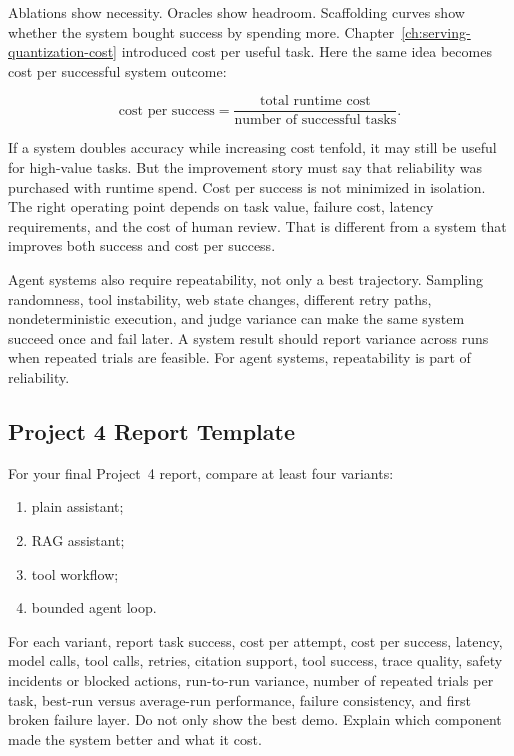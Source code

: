 Ablations show necessity. Oracles show headroom. Scaffolding curves show whether the system bought success by spending more. Chapter~\ref{ch:serving-quantization-cost} introduced cost per useful task. Here the same idea becomes cost per successful system outcome:

\[
\text{cost per success} = \frac{\text{total runtime cost}}{\text{number of successful tasks}}.
\]

If a system doubles accuracy while increasing cost tenfold, it may still be useful for high-value tasks. But the improvement story must say that reliability was purchased with runtime spend. Cost per success is not minimized in isolation. The right operating point depends on task value, failure cost, latency requirements, and the cost of human review. That is different from a system that improves both success and cost per success.

Agent systems also require repeatability, not only a best trajectory. Sampling randomness, tool instability, web state changes, different retry paths, nondeterministic execution, and judge variance can make the same system succeed once and fail later. A system result should report variance across runs when repeated trials are feasible. For agent systems, repeatability is part of reliability.

\subsection{Project 4 Report Template}

\begin{tcolorbox}[colback=orange!5, colframe=orange!60, title=\textbf{For Project 4: Report an Attribution Profile}]
For your final Project~4 report, compare at least four variants:
\begin{enumerate}[nosep]
  \item plain assistant;
  \item RAG assistant;
  \item tool workflow;
  \item bounded agent loop.
\end{enumerate}
For each variant, report task success, cost per attempt, cost per success, latency, model calls, tool calls, retries, citation support, tool success, trace quality, safety incidents or blocked actions, run-to-run variance, number of repeated trials per task, best-run versus average-run performance, failure consistency, and first broken failure layer. Do not only show the best demo. Explain which component made the system better and what it cost.
\end{tcolorbox}

